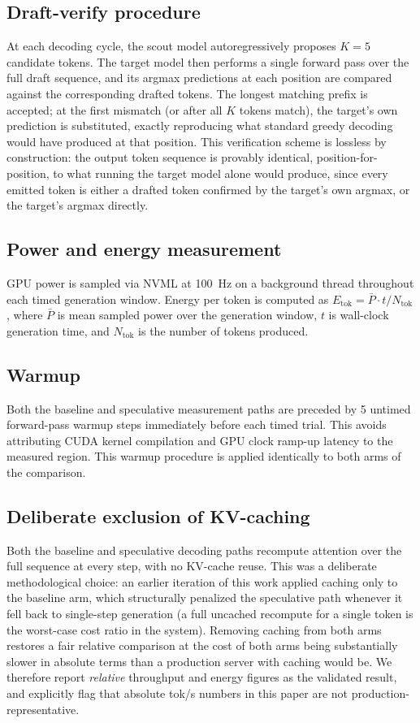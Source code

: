 \documentclass[conference]{IEEEtran}
\begin{document}
\subsection{Draft-verify procedure}

At each decoding cycle, the scout model autoregressively proposes $K{=}5$
candidate tokens. The target model then performs a single forward pass over
the full draft sequence, and its argmax predictions at each position are
compared against the corresponding drafted tokens. The longest matching
prefix is accepted; at the first mismatch (or after all $K$ tokens match),
the target's own prediction is substituted, exactly reproducing what
standard greedy decoding would have produced at that position. This
verification scheme is lossless by construction: the output token sequence
is provably identical, position-for-position, to what running the target
model alone would produce, since every emitted token is either a drafted
token confirmed by the target's own argmax, or the target's argmax directly.

\subsection{Power and energy measurement}

GPU power is sampled via NVML at 100~Hz on a background thread throughout
each timed generation window. Energy per token is computed as
$E_{\text{tok}} = \bar{P} \cdot t / N_{\text{tok}}$, where $\bar{P}$ is mean
sampled power over the generation window, $t$ is wall-clock generation time,
and $N_{\text{tok}}$ is the number of tokens produced.

\subsection{Warmup}

Both the baseline and speculative measurement paths are preceded by 5
untimed forward-pass warmup steps immediately before each timed trial. This
avoids attributing CUDA kernel compilation and GPU clock ramp-up latency to
the measured region. This warmup procedure is applied identically to both
arms of the comparison.

\subsection{Deliberate exclusion of KV-caching}

Both the baseline and speculative decoding paths recompute attention over
the full sequence at every step, with no KV-cache reuse. This was a
deliberate methodological choice: an earlier iteration of this work applied
caching only to the baseline arm, which structurally penalized the
speculative path whenever it fell back to single-step generation (a full
uncached recompute for a single token is the worst-case cost ratio in the
system). Removing caching from both arms restores a fair relative
comparison at the cost of both arms being substantially slower in absolute
terms than a production server with caching would be. We therefore report
\emph{relative} throughput and energy figures as the validated result, and
explicitly flag that absolute tok/s numbers in this paper are not
production-representative.
\end{document}
